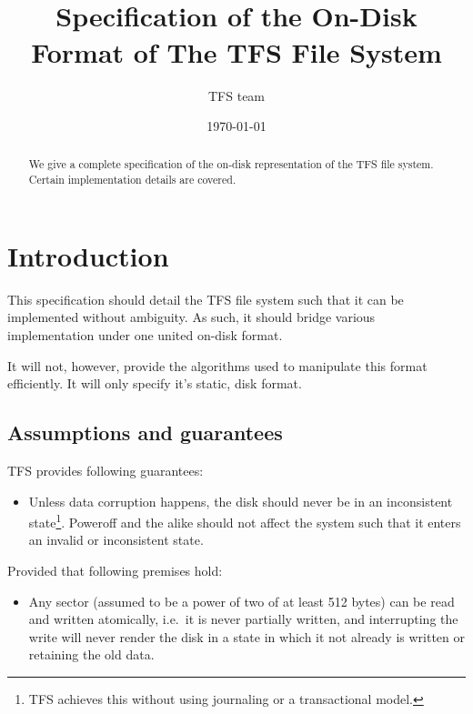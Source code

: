 \documentclass[11pt,a4paper]{report}
\title{
    \centering{}\\
    Specification of the On-Disk Format of The TFS File System
}
\author{TFS team}
\date{\today}
\newcommand{\minimumsectorsize}{512 }
\begin{document}
    \maketitle

    \begin{abstract}
        We give a complete specification of the on-disk representation of the
        TFS file system. Certain implementation details are covered.
    \end{abstract}

    \tableofcontents

    \chapter{Introduction}
    This specification should detail the TFS file system such that it can be
    implemented without ambiguity. As such, it should bridge various
    implementation under one united on-disk format.

    It will not, however, provide the algorithms used to manipulate this format
    efficiently. It will only specify it's static, disk format.

    \section{Assumptions and guarantees}
    \label{assumptions_guarantees}
        TFS provides following guarantees:

        \begin{itemize}
            \item Unless data corruption happens, the disk should never be in
                an inconsistent state\footnote{TFS achieves this without using
                journaling or a transactional model.}. Poweroff and the alike
                should not affect the system such that it enters an invalid or
                inconsistent state.
        \end{itemize}

        Provided that following premises hold:

        \begin{itemize}
            \item Any sector (assumed to be a power of two of at least
                \minimumsectorsize bytes) can be read and written atomically,
                i.e.\ it is never partially written, and interrupting the write
                will never render the disk in a state in which it not already
                is written or retaining the old data.
        \end{itemize}
\end{document}
